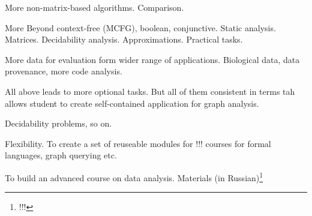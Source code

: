 \documentclass[sigconf]{acmart}
\begin{document}
More non-matrix-based algorithms. Comparison.

More Beyond context-free (MCFG), boolean, conjunctive. 
Static analysis.
Matrices. 
Decidability analysis. Approximations.
Practical tasks.

More data for evaluation form wider range of applications.
Biological data, data provenance, more code analysis.

All above leads to more optional tasks.
But all of them consistent in terms tah allows student to create self-contained application for graph analysis.

Decidability problems, so on.

Flexibility. 
To create a set of reuseable modules for !!! courses for formal languages, graph querying etc.

To build an advanced course on data analysis. 
Materials (in Russian)\footnote{!!!}



\end{document}
